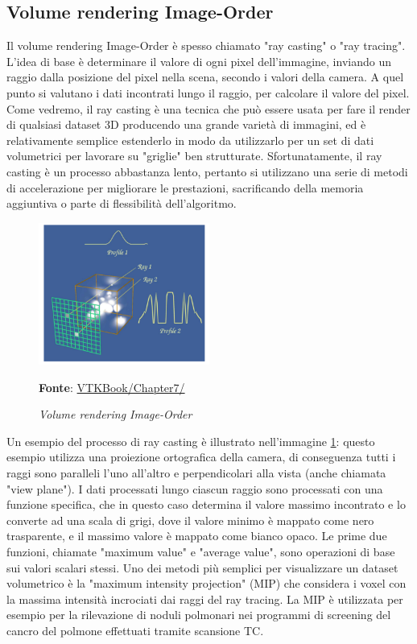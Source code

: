 \subsection{Volume rendering Image-Order}\label{sec:volume-image-order}
Il volume rendering Image-Order è spesso chiamato "ray casting" o "ray tracing". L'idea di base è determinare il valore di ogni pixel dell'immagine, inviando un raggio dalla posizione del pixel nella scena, secondo i valori della camera. A quel punto si  valutano i dati incontrati lungo il raggio, per calcolare il valore del pixel. Come vedremo, il ray casting è una tecnica che può essere usata per fare il render di qualsiasi dataset 3D producendo una grande varietà di immagini, ed è relativamente semplice estenderlo in modo da utilizzarlo per un set di dati volumetrici per lavorare su "griglie" ben strutturate. Sfortunatamente, il ray casting è un processo abbastanza lento, pertanto si utilizzano una serie di metodi di accelerazione per migliorare le prestazioni, sacrificando della memoria aggiuntiva o parte di flessibilità dell'algoritmo.

\begin{figure}[h]
    \centering
    \includegraphics[width=0.5\textwidth]{immagini/volumerendering/imageorder.png}
    \caption{\textit{Volume rendering Image-Order}}
    \textbf{Fonte}: \href{https://lorensen.github.io/VTKExamples/site/VTKBook/07Chapter7/}{VTKBook/Chapter7/}
    \label{fig: Volume Rendering Image-Order}
\end{figure}

Un esempio del processo di ray casting è illustrato nell'immagine \ref{fig: Volume Rendering Image-Order}: questo esempio utilizza una proiezione ortografica della camera, di conseguenza tutti i raggi sono paralleli l'uno all'altro e perpendicolari alla vista (anche chiamata "view plane").
I dati processati lungo ciascun raggio sono processati con una funzione specifica, che in questo caso determina il valore massimo incontrato e lo converte ad una scala di grigi, dove il valore minimo è mappato come nero trasparente, e il massimo valore è mappato come bianco opaco. Le prime due funzioni, chiamate "maximum value" e "average value", sono operazioni di base sui valori scalari stessi. Uno dei metodi più semplici per visualizzare un dataset volumetrico è la "maximum intensity projection" (MIP) che considera i voxel con la massima intensità incrociati dai raggi del ray tracing. La MIP è utilizzata per esempio per la rilevazione di noduli polmonari nei programmi di screening del cancro del polmone effettuati tramite scansione TC.

